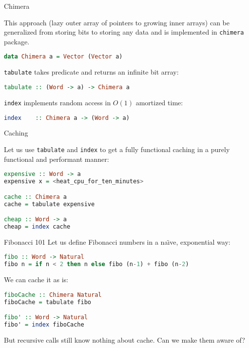 \documentclass[handout]{beamer}
\begin{document}
\begin{frame}[fragile]{Chimera}

This approach (lazy outer array of pointers to growing inner arrays)
can be generalized from storing bits to storing any data \pause and
is implemented in {\tt chimera} package.

\begin{lstlisting}[language=Haskell]
data Chimera a = Vector (Vector a)
\end{lstlisting}

\pause

{\tt tabulate} takes predicate and returns an infinite bit array:

\begin{lstlisting}[language=Haskell]
tabulate :: (Word -> a) -> Chimera a
\end{lstlisting}

\pause

{\tt index} implements random access in $O(1)$ amortized time:

\begin{lstlisting}[language=Haskell]
index    :: Chimera a -> (Word -> a)
\end{lstlisting}

\end{frame}

\begin{frame}[fragile]{Caching}

Let us use {\tt tabulate} and {\tt index} to get a fully functional caching
in a purely functional and performant manner:

\begin{lstlisting}[language=Haskell]
expensive :: Word -> a
expensive x = <heat_cpu_for_ten_minutes>

cache :: Chimera a
cache = tabulate expensive

cheap :: Word -> a
cheap = index cache
\end{lstlisting}

\end{frame}


\begin{frame}[fragile]{Fibonacci 101}
Let us define Fibonacci numbers in a na\"{\i}ve, exponential way:

\begin{lstlisting}[language=Haskell]
fibo :: Word -> Natural
fibo n = if n < 2 then n else fibo (n-1) + fibo (n-2)
\end{lstlisting}

\pause

We can cache it as is:

\begin{lstlisting}[language=Haskell]
fiboCache :: Chimera Natural
fiboCache = tabulate fibo

fibo' :: Word -> Natural
fibo' = index fiboCache
\end{lstlisting}

But recursive calls still know nothing about cache. Can we make them aware of?

\end{frame}
\end{document}
